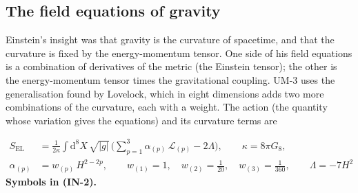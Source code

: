 \documentclass[
  10pt,
]{article}
\begin{document}
\hypertarget{the-field-equations-of-gravity}{%
\subsection{The field equations of
gravity}\label{the-field-equations-of-gravity}}

Einstein's insight was that gravity is the curvature of spacetime, and
that the curvature is fixed by the energy-momentum tensor. One side of
his field equations is a combination of derivatives of the metric (the
Einstein tensor); the other is the energy-momentum tensor times the
gravitational coupling. UM-3 uses the generalisation found by Lovelock,
which in eight dimensions adds two more combinations of the curvature,
each with a weight. The action (the quantity whose variation gives the
equations) and its curvature terms are

\[
\begin{aligned}
S_{\mathrm{EL}} &= \frac{1}{2\kappa}\int\mathrm{d}^8X\,\sqrt{\lvert g\rvert}\,\Big(\sum_{p=1}^{3}\alpha_{(p)}\,\mathcal{L}_{(p)}
 - 2\Lambda\Big),\qquad \kappa = 8\pi G_8,\\
\alpha_{(p)} &= w_{(p)}\,H^{2-2p},\qquad w_{(1)} = 1,\quad w_{(2)} = \frac{1}{20},\quad w_{(3)} = \frac{1}{360},
 \qquad \Lambda = -7H^2
\end{aligned} \tag{IN-2}
\] \textbf{Symbols in (IN-2).}
\end{document}
